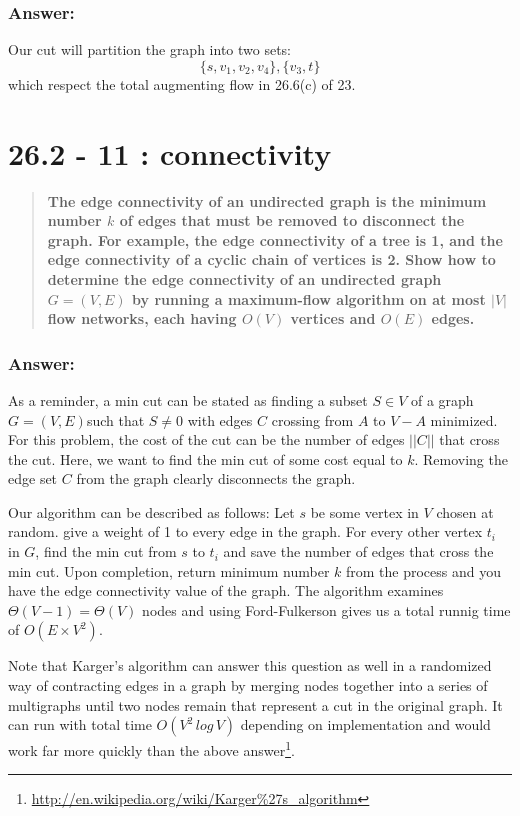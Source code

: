 \documentclass[titlepage]{article}\usepackage[]{graphicx}\usepackage[]{color}
\begin{document}
  \subsubsection{Answer:}
  Our cut will partition the graph into two sets:
  \[ \{s, v_1, v_2, v_4\}, \{v_3, t\} \]
  which respect the total augmenting flow in 26.6(c) of 23.


\section{26.2 - 11 : connectivity}
  \begin{quote}
    \textbf{The edge connectivity of an undirected graph is the minimum number
      $k$ of edges that must be removed to disconnect the graph. For example,
      the edge connectivity of a tree is 1, and the edge connectivity of a
      cyclic chain of vertices is 2. Show how to determine the edge
      connectivity of an undirected graph $G = (V,E) $ by running a
      maximum-flow algorithm on at most $|V|$ flow networks, each having $O(V)$
      vertices and $O(E)$ edges.}
  \end{quote}

  \subsubsection{Answer:}
  As a reminder, a min cut can be stated as finding a subset $S \in V$ of a graph $G =
  (V,E)$such that $S \neq 0$ with edges $C$ crossing from $A$ to $V-A$ minimized.
  For this problem, the cost of the cut can be the number of edges $||C||$ that
  cross the cut. Here, we want to find the min cut of some cost equal to $k$.
  Removing the edge set  $C$ from the graph clearly disconnects the graph. 

  Our algorithm can be described as follows:
  Let $s$ be some vertex in $V$ chosen at random. give a weight of 1 to every
  edge in the graph. For every other vertex $t_i$ in $G$, find the min cut from $s$
  to $t_i$ and save the number of edges that cross the min cut. Upon
  completion, return minimum number $k$ from the process and you have the
  edge connectivity value of the graph. The algorithm examines $\Theta(V-1) =
  \Theta(V)$ nodes and using Ford-Fulkerson gives us a total runnig time of
    $O(E\times V^2)$.

  Note that Karger's algorithm can answer this question as well in a
  randomized way of contracting edges in a graph by merging nodes together
  into a series of multigraphs until two nodes remain that represent a cut in
  the original graph. It can run with total time $O(V^2\, log\, V)$
  depending on implementation and would work far more quickly than the above
  answer\footnote{\url{http://en.wikipedia.org/wiki/Karger\%27s_algorithm}}. 
\end{document}
